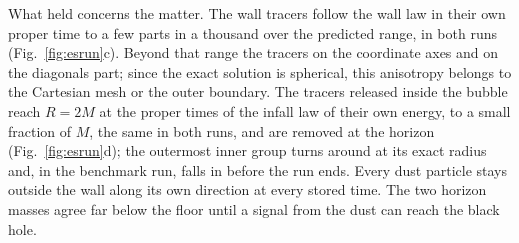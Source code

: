 \documentclass[aps,prd,twocolumn,10pt,superscriptaddress,nofootinbib,longbibliography,floatfix]{revtex4-2}
\begin{document}
What held concerns the matter. The wall tracers follow the wall law in their own proper time to a few parts in a thousand over the predicted range, in both runs (Fig.~\ref{fig:esrun}c). Beyond that range the tracers on the coordinate axes and on the diagonals part; since the exact solution is spherical, this anisotropy belongs to the Cartesian mesh or the outer boundary. The tracers released inside the bubble reach $R=2M$ at the proper times of the infall law of their own energy, to a small fraction of $M$, the same in both runs, and are removed at the horizon (Fig.~\ref{fig:esrun}d); the outermost inner group turns around at its exact radius and, in the benchmark run, falls in before the run ends. Every dust particle stays outside the wall along its own direction at every stored time. The two horizon masses agree far below the floor until a signal from the dust can reach the black hole.
\end{document}
